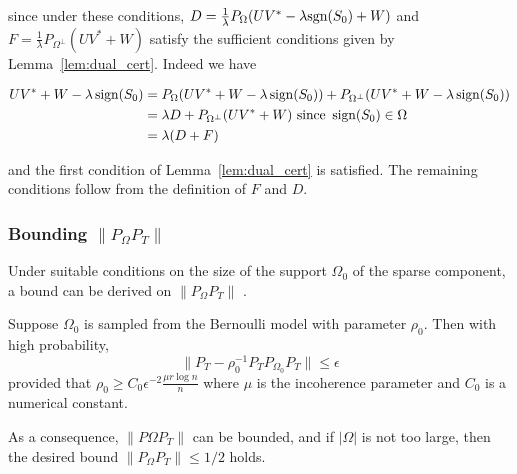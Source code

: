 since under these conditions, $D = \frac{1}{\lambda} P_\Omega (UV^* - \lambda \text{sgn}(S_0) + W)$ and $F = \frac{1}{\lambda} P_{\Omega^\perp} (UV^* + W)$ satisfy the sufficient conditions given by Lemma~\ref{lem:dual_cert}. Indeed we have

\begin{align*}
UV^* + W - \lambda \operatorname{sign}(S_0) 
&= P_\Omega (UV^* + W - \lambda \operatorname{sign}(S_0))+ P_{\Omega^\perp} (UV^* + W - \lambda \operatorname{sign}(S_0)) \\
&= \lambda D+ P_{\Omega^\perp} (UV^* + W) \text{ since } \operatorname{sign}(S_0) \in \Omega\\
&= \lambda (D+F)
\end{align*}

and the first condition of Lemma~\ref{lem:dual_cert} is satisfied. The remaining conditions follow from the definition of $F$ and $D$.

\subsubsection{Bounding $\|P_\Omega P_T\|$}
 Under suitable conditions on the size of the support $\Omega_0$ of the sparse component, a bound can be derived on  $\|P_\Omega P_T\|$ \cite{Candes:2009uq}.
\begin{theorem}
Suppose $\Omega_0$ is sampled from the Bernoulli model with parameter $\rho_0$. Then with high probability,
\[
\|P_T - \rho_0^{-1} P_T P_{\Omega_0} P_T\| \leq \epsilon
\]
provided that $\rho_0 \geq C_0 \epsilon^{-2} \frac{\mu r \log n}{n}$ where $\mu$ is the incoherence parameter and $C_0$ is a numerical constant.
\end{theorem}

As a consequence, $\|P\Omega P_T\|$ can be bounded, and if $|\Omega|$ is not too large, then the desired bound $\|P_\Omega P_T\| \leq 1/2$ holds.